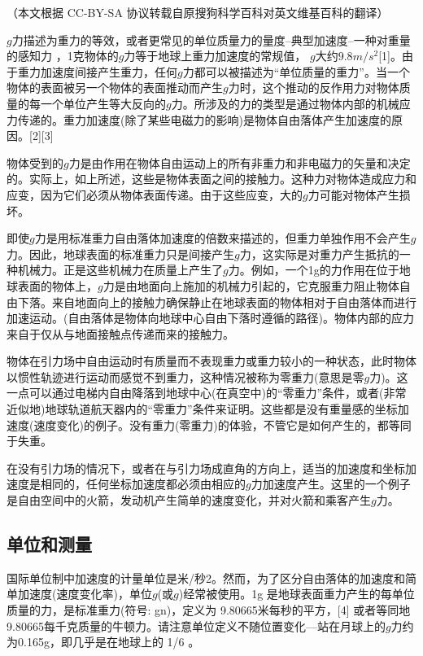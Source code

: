 
（本文根据 CC-BY-SA 协议转载自原搜狗科学百科对英文维基百科的翻译）

$g$力描述为重力的等效，或者更常见的单位质量力的量度–典型加速度–一种对重量的感知力 ，1克物体的$g$力等于地球上重力加速度的常规值， $g$大约$9.8 m/s^2$[1]。由于重力加速度间接产生重力，任何$g$力都可以被描述为“单位质量的重力”。当一个物体的表面被另一个物体的表面推动而产生$g$力时，这个推动的反作用力对物体质量的每一个单位产生等大反向的$g$力。所涉及的力的类型是通过物体内部的机械应力传递的。重力加速度(除了某些电磁力的影响)是物体自由落体产生加速度的原因。[2][3]

物体受到的$g$力是由作用在物体自由运动上的所有非重力和非电磁力的矢量和决定的。实际上，如上所述，这些是物体表面之间的接触力。这种力对物体造成应力和应变，因为它们必须从物体表面传递。由于这些应变，大的$g$力可能对物体产生损坏。

即使$g$力是用标准重力自由落体加速度的倍数来描述的，但重力单独作用不会产生$g$力。因此，地球表面的标准重力只是间接产生$g$力，这实际是对重力产生抵抗的一种机械力。正是这些机械力在质量上产生了$g$力。例如，一个1g的力作用在位于地球表面的物体上，$g$力是由地面向上施加的机械力引起的，它克服重力阻止物体自由下落。来自地面向上的接触力确保静止在地球表面的物体相对于自由落体而进行加速运动。(自由落体是物体向地球中心自由下落时遵循的路径)。物体内部的应力来自于仅从与地面接触点传递而来的接触力。

物体在引力场中自由运动时有质量而不表现重力或重力较小的一种状态，此时物体以惯性轨迹进行运动而感觉不到重力，这种情况被称为零重力(意思是零$g$力)。这一点可以通过电梯内自由降落到地球中心(在真空中)的“零重力”条件，或者(非常近似地)地球轨道航天器内的“零重力”条件来证明。这些都是没有重量感的坐标加速度(速度变化)的例子。没有重力(零重力)的体验，不管它是如何产生的，都等同于失重。

在没有引力场的情况下，或者在与引力场成直角的方向上，适当的加速度和坐标加速度是相同的，任何坐标加速度都必须由相应的$g$力加速度产生。这里的一个例子是自由空间中的火箭，发动机产生简单的速度变化，并对火箭和乘客产生$g$力。

\subsection{单位和测量}
国际单位制中加速度的计量单位是米/秒2。然而，为了区分自由落体的加速度和简单加速度(速度变化率)，单位$g$(或$g$)经常被使用。1g 是地球表面重力产生的每单位质量的力，是标准重力(符号: gn)，定义为 9.80665米每秒的平方，[4] 或者等同地 9.80665每千克质量的牛顿力。请注意单位定义不随位置变化—站在月球上的$g$力约为0.165g，即几乎是在地球上的 1/6 。

